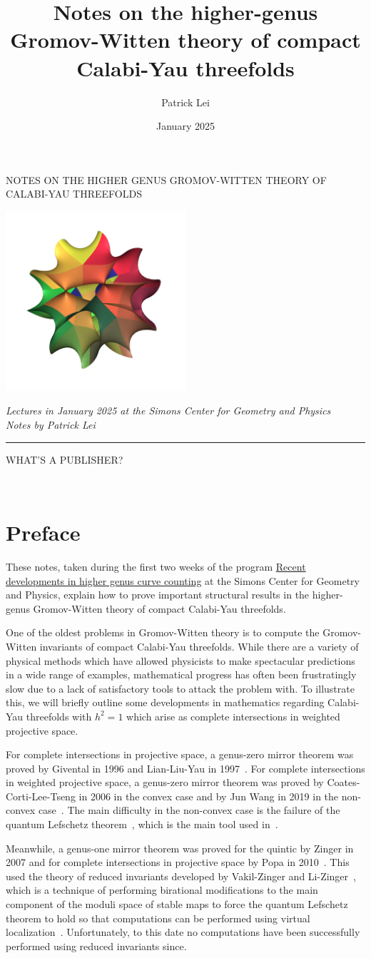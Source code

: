 \documentclass[10pt,oldfontcommands,oneside]{memoir}
\title{Notes on the higher-genus Gromov-Witten theory of compact Calabi-Yau threefolds}
\author{Patrick Lei}
\date{January 2025}
\theoremstyle{definition}
\theoremstyle{remark}
\theoremstyle{plain}
\theoremstyle{definition}
\theoremstyle{remark}
\newcommand{\1}{\mathbf{1}}
\newcommand{\2}{\mathbf{2}}
\newcommand{\3}{\mathbf{3}}
\newcommand*{\titleGWP}{\begingroup%
\newlength{\drop}
\setlength{\drop}{0.1\textheight}
\vspace*{\drop}
\begin{center}
\Huge\color{violet}
NOTES ON THE HIGHER GENUS GROMOV-WITTEN THEORY OF CALABI-YAU THREEFOLDS
\end{center}
\vfill
\begin{center}
{\includegraphics[width=0.5\textwidth]{CalabiYau5}}
\end{center}
\vfill
\begin{center}
\large
{\itshape Lectures in January 2025 at the Simons Center for Geometry and Physics \\
\normalsize
Notes by Patrick Lei} \\
{\color{violet} \rule{\textwidth}{0.4pt}}
WHAT'S A PUBLISHER?
\end{center}
\vspace*{0.5\drop}
\endgroup}
\begin{document}
    


\titleGWP\thispagestyle{empty}
\newpage
\ \thispagestyle{empty}
\newpage

\frontmatter
\chapter*{Preface}\thispagestyle{frontmatter}
\label{sec:Introduction}

These notes, taken during the first two weeks of the program \href{https://scgp.stonybrook.edu/archives/42649}{Recent developments in higher genus curve counting} at the Simons Center for Geometry and Physics, explain how to prove important structural results in the higher-genus Gromov-Witten theory of compact Calabi-Yau threefolds. 

One of the oldest problems in Gromov-Witten theory is to compute the Gromov-Witten invariants of compact Calabi-Yau threefolds. While there are a variety of physical methods which have allowed physicists to make spectacular predictions in a wide range of examples, mathematical progress has often been frustratingly slow due to a lack of satisfactory tools to attack the problem with. To illustrate this, we will briefly outline some developments in mathematics regarding Calabi-Yau threefolds with $h^2 = 1$ which arise as complete intersections in weighted projective space.

For complete intersections in projective space, a genus-zero mirror theorem was proved by Givental in 1996 and Lian-Liu-Yau in 1997~\cite{eqgwinv,lly}.
For complete intersections in weighted projective space, a genus-zero mirror theorem was proved by Coates-Corti-Lee-Tseng in 2006 in the convex case and by Jun Wang in 2019 in the non-convex case~\cite{orbqcohwproj,mirrornonconvex}. The main difficulty in the non-convex case is the failure of the quantum Lefschetz theorem~\cite{qrr}, which is the main tool used in~\cite{eqgwinv,lly,orbqcohwproj}.

Meanwhile, a genus-one mirror theorem was proved for the quintic by Zinger in 2007 and for complete intersections in projective space by Popa in 2010~\cite{reducedgenus1,popagenus1ci}. This used the theory of reduced invariants developed by Vakil-Zinger and Li-Zinger~\cite{desingularizationgenusone,g1cilizinger}, which is a technique of performing birational modifications to the main component of the moduli space of stable maps to force the quantum Lefschetz theorem to hold so that computations can be performed using virtual localization~\cite{virtloc}. Unfortunately, to this date no computations have been successfully performed using reduced invariants since.
\end{document}
